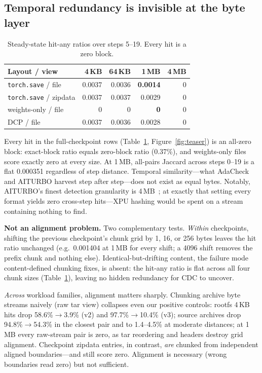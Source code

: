\documentclass[sigconf,10pt,anonymous,review]{acmart}
\begin{document}
\subsection{Temporal redundancy is invisible at the byte layer}

\begin{table}[t]
\caption{Steady-state hit-any ratios over steps 5--19. Every hit is a
zero block.}
\label{tab:f1}
\footnotesize
\setlength{\tabcolsep}{5pt}
\begin{tabular}{lrrrr}
\toprule
\textbf{Layout / view} & \textbf{4\,KB} & \textbf{64\,KB} &
\textbf{1\,MB} & \textbf{4\,MB} \\
\midrule
\texttt{torch.save} / file    & 0.0037 & 0.0036 & \textbf{0.0014} & 0 \\
\texttt{torch.save} / zipdata & 0.0037 & 0.0037 & 0.0029 & 0 \\
weights-only / file           & 0      & 0      & \textbf{0}      & 0 \\
DCP / file                    & 0.0037 & 0.0036 & 0.0028 & 0 \\
\bottomrule
\end{tabular}
\end{table}

Every hit in the full-checkpoint rows
(Table~\ref{tab:f1}, Figure~\ref{fig:teaser}) is an all-zero block:
exact-block ratio equals zero-block ratio (0.37\%), and weights-only
files score exactly zero at every size. At 1\,MB, all-pairs Jaccard
across steps 0--19 is a flat 0.000351 regardless of step distance.
Temporal similarity---what AdaCheck and AITURBO harvest step after
step---does not exist as equal bytes. Notably, AITURBO's finest
detection granularity is 4\,MB~\cite{aiturbo}; at exactly that setting
every format yields zero cross-step hits---XPU hashing would be spent on
a stream containing nothing to find.

\noindent\textbf{Not an alignment problem.}
Two complementary tests. \emph{Within} checkpoints, shifting the previous
checkpoint's chunk grid by 1, 16, or 256 bytes leaves the hit ratio
unchanged (e.g.\ 0.001404 at 1\,MB for every shift; a 4096 shift removes
the prefix chunk and nothing else). Identical-but-drifting content, the
failure mode content-defined chunking fixes, is absent: the hit-any
ratio is flat across all four chunk sizes (Table~\ref{tab:f1}), leaving
no hidden redundancy for CDC to uncover.

\emph{Across} workload families, alignment matters sharply. Chunking
archive byte streams naively (raw tar view) collapses even our positive
controls: rootfs 4\,KB hits drop 58.6\%$\to$3.9\% (v2) and
97.7\%$\to$10.4\% (v3); source archives drop 94.8\%$\to$54.3\% in the
closest pair and to 1.4--4.5\% at moderate distances; at 1\,MB every
raw-stream pair is zero, as tar reordering and headers destroy grid
alignment. Checkpoint zipdata entries, in contrast, \emph{are} chunked
from independent aligned boundaries---and still score zero. Alignment is
necessary (wrong boundaries read zero) but not sufficient.
\end{document}
